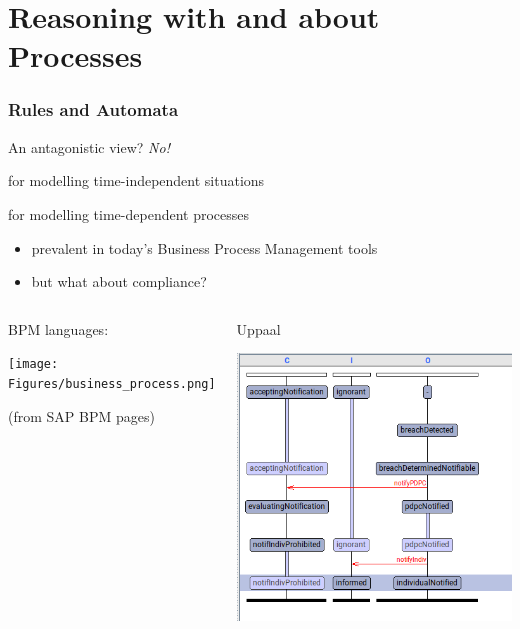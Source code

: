 \documentclass{beamer}
\begin{document}
\section{Reasoning with and about Processes}


\begin{frame}[fragile]\frametitle{Rules and Automata}

  An antagonistic view? \emph{No!}

 for modelling time-independent situations

 for modelling time-dependent processes
\begin{itemize}
\item prevalent in today's Business Process Management tools
\item but what about compliance?
\end{itemize}

\begin{columns}
  \begin{center}
  BPM languages:

    \texttt{[image: Figures/business\_process.png]}
    
    \tiny{(from  SAP BPM pages)}
  \end{center}
  \begin{center}
    Uppaal 
  
    \includegraphics[scale=0.35]{Figures/uppaal_swimlane.png}
  \end{center}
\end{columns}

\end{frame}
\end{document}
